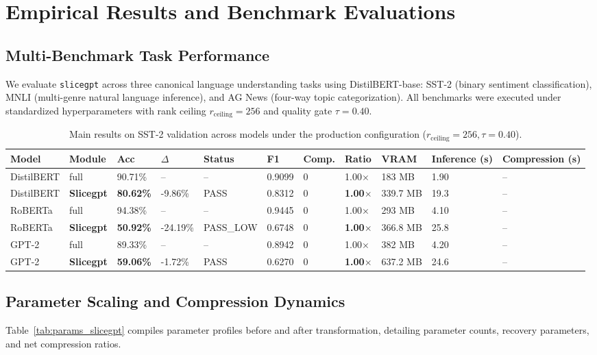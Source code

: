 \section{Empirical Results and Benchmark Evaluations}
\label{sec:results}

\subsection{Multi-Benchmark Task Performance}
We evaluate \texttt{slicegpt} across three canonical language understanding tasks using DistilBERT-base: SST-2 (binary sentiment classification), MNLI (multi-genre natural language inference), and AG News (four-way topic categorization). All benchmarks were executed under standardized hyperparameters with rank ceiling $r_{\mathrm{ceiling}} = 256$ and quality gate $\tau = 0.40$.

\begin{table}[t]
\centering
\small
\begin{tabular}{lllllllllll}
\toprule
\textbf{Model} & \textbf{Module} & \textbf{Acc} & \textbf{$\Delta$} & \textbf{Status} & \textbf{F1} & \textbf{Comp.} & \textbf{Ratio} & \textbf{VRAM} & \textbf{Inference (s)} & \textbf{Compression (s)} \\
\midrule
DistilBERT & full & 90.71\% & -- & -- & 0.9099 & 0 & 1.00$\times$ & 183 MB & 1.90 & -- \\
DistilBERT & \textbf{Slicegpt} & \textbf{80.62\%} & -9.86\% & PASS & 0.8312 & 0 & \textbf{1.00$\times$} & 339.7 MB & 19.3 & -- \\
RoBERTa & full & 94.38\% & -- & -- & 0.9445 & 0 & 1.00$\times$ & 293 MB & 4.10 & -- \\
RoBERTa & \textbf{Slicegpt} & \textbf{50.92\%} & -24.19\% & PASS\_LOW & 0.6748 & 0 & \textbf{1.00$\times$} & 366.8 MB & 25.8 & -- \\
GPT-2 & full & 89.33\% & -- & -- & 0.8942 & 0 & 1.00$\times$ & 382 MB & 4.20 & -- \\
GPT-2 & \textbf{Slicegpt} & \textbf{59.06\%} & -1.72\% & PASS & 0.6270 & 0 & \textbf{1.00$\times$} & 637.2 MB & 24.6 & -- \\
\bottomrule
\end{tabular}
\caption{Main results on SST-2 validation across models under the production configuration ($r_{\mathrm{ceiling}}=256, \tau=0.40$).}
\label{tab:main_sst2}
\end{table}

\subsection{Parameter Scaling and Compression Dynamics}
Table~\ref{tab:params_slicegpt} compiles parameter profiles before and after transformation, detailing parameter counts, recovery parameters, and net compression ratios.


